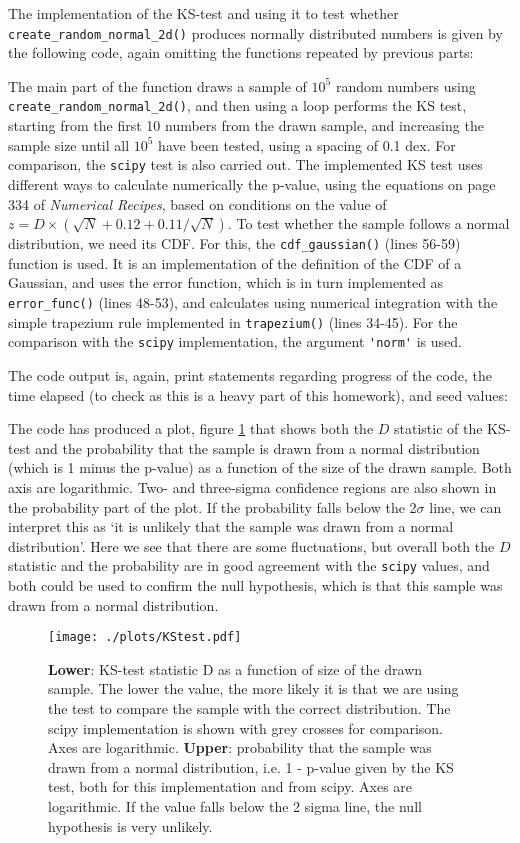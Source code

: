 \documentclass{article}
\begin{document}
The implementation of the KS-test and using it to test whether \verb+create_random_normal_2d()+ produces normally distributed numbers is given by the following code, again omitting the functions repeated by previous parts:


The main part of the function draws a sample of $10^5$ random numbers using \verb+create_random_normal_2d()+, and then using a loop performs the KS test, starting from the first 10 numbers from the drawn sample, and increasing the sample size until all $10^5$ have been tested, using a spacing of 0.1 dex. For comparison, the \verb+scipy+ test is also carried out. The implemented KS test uses different ways to calculate numerically the p-value, using the equations on page 334 of \textit{Numerical Recipes}, based on conditions on the value of $z = D\times (\sqrt{N} + 0.12 + 0.11/\sqrt{N})$. To test whether the sample follows a normal distribution, we need its CDF. For this, the \verb+cdf_gaussian()+ (lines 56-59) function is used. It is an implementation of the definition of the CDF of a Gaussian, and uses the error function, which is in turn implemented as \verb+error_func()+ (lines 48-53), and calculates using numerical integration with the simple trapezium rule implemented in \verb+trapezium()+ (lines 34-45). For the comparison with the \verb+scipy+ implementation, the argument \verb+'norm'+ is used. 

The code output is, again, print statements regarding progress of the code, the time elapsed (to check as this is a heavy part of this homework), and seed values:



The code has produced a plot, figure \ref{fig:KS} that shows both the $D$ statistic of the KS-test and the probability that the sample is drawn from a normal distribution (which is 1 minus the p-value) as a function of the size of the drawn sample. Both axis are logarithmic. Two- and three-sigma confidence regions are also shown in the probability part of the plot. If the probability falls below the 2$\sigma$ line, we can interpret this as `it is unlikely that the sample was drawn from a normal distribution'. Here we see that there are some fluctuations, but overall both the $D$ statistic and the probability are in good agreement with the \verb+scipy+ values, and both could be used to confirm the null hypothesis, which is that this sample was drawn from a normal distribution.

\begin{figure}
	\centering
	\texttt{[image: ./plots/KStest.pdf]}
	\caption{\textbf{Lower}: KS-test statistic D as a function of size of the drawn sample. The lower the value, the more likely it is that we are using the test to compare the sample with the correct distribution. The scipy implementation is shown with grey crosses for comparison. Axes are logarithmic. \textbf{Upper}: probability that the sample was drawn from a normal distribution, i.e. 1 - p-value given by the KS test, both for this implementation and from scipy. Axes are logarithmic. If the value falls below the 2 sigma line, the null hypothesis is very unlikely.}
	\label{fig:KS}
\end{figure}
\end{document}

